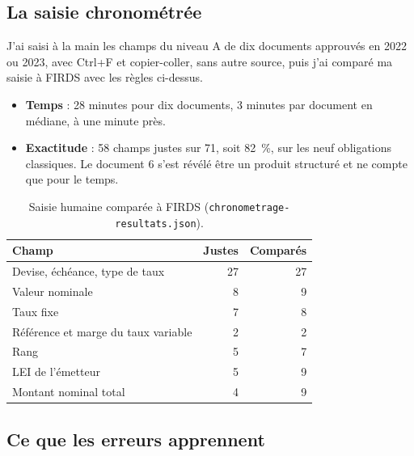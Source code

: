 \documentclass[11pt,a4paper]{article}
\begin{document}
\subsection{La saisie chronométrée}

J'ai saisi à la main les champs du niveau A de dix documents approuvés en 2022 ou 2023, avec Ctrl+F et copier-coller, sans autre source, puis j'ai comparé ma saisie à FIRDS avec les règles ci-dessus.

\begin{itemize}
  \item \textbf{Temps} : 28 minutes pour dix documents, 3 minutes par document en médiane, à une minute près.
  \item \textbf{Exactitude} : 58 champs justes sur 71, soit 82~\%, sur les neuf obligations classiques. Le document 6 s'est révélé être un produit structuré et ne compte que pour le temps.
\end{itemize}

\begin{table}[H]
\small
\begin{tabularx}{\linewidth}{Yrr}
\toprule
\textbf{Champ} & \textbf{Justes} & \textbf{Comparés} \\
\midrule
Devise, échéance, type de taux & 27 & 27 \\
Valeur nominale & 8 & 9 \\
Taux fixe & 7 & 8 \\
Référence et marge du taux variable & 2 & 2 \\
Rang & 5 & 7 \\
LEI de l'émetteur & 5 & 9 \\
Montant nominal total & 4 & 9 \\
\bottomrule
\end{tabularx}
\caption{Saisie humaine comparée à FIRDS (\texttt{chronometrage-resultats.json}).}
\end{table}

\subsection{Ce que les erreurs apprennent}
\end{document}
